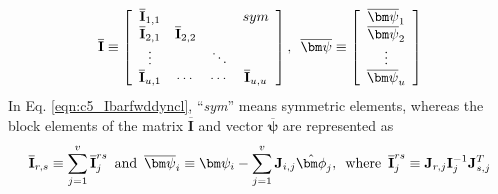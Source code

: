 {	\begin{equation}
	\label{eqn:c5_Ibarfwddyncl}
	\overline{\textbf{I}} \equiv
	\left[ \begin{array}{cccc}
	\overline{\textbf{I}}_{1,1} & \hspace*{5pt} & \hspace*{5pt} &  sym\\
	\overline{\textbf{I}}_{2,1} & \overline{\textbf{I}}_{2,2} & \hspace*{5pt} & \hspace*{5pt}\\
	\vdots & & \ddots & \hspace*{5pt} \\
	\overline{\textbf{I}}_{u,1}  & \cdots&  \cdots & \overline{\textbf{I}}_{u,u}  \\
	\end{array} \right], \hspace*{5pt}
	\mbox{$\overline{\bm\psi}$} \equiv  
	\left[ \begin{array}{c}
	\mbox{$\overline{\bm\psi}_1$}\\
	\mbox{$\overline{\bm\psi}_2$}\\
	\vdots\\
	\mbox{$\overline{\bm\psi}_u$}\\
	\end{array} \right]
	\end{equation}
	In Eq. \ref{eqn:c5_Ibarfwddyncl}, ``\emph{sym}'' means symmetric elements, whereas the block elements of the matrix $\overline{\textbf{I}}$ and vector \mbox{$\overline{\bm\psi}$} are represented as 
	\begin{equation}
	\label{eqn:c5_I_rsandPsi_cap}
	\overline{\textbf{I}}_{r,s} \equiv \sum_{j=1}^{v} \overline{\textbf{I}}_j^{rs} \hspace*{5pt} \mathrm{and} \hspace*{5pt} \mbox{$\overline{\bm\psi}_i$} \equiv \mbox{$\bm\psi_i$} - \sum_{j=1}^{v} \textbf{J}_{i,j}\hat{\bm\phi}_j, \hspace*{5pt} \mathrm{where} \hspace*{5pt} \overline{\textbf{I}}_j^{rs} \equiv \textbf{J$_{r,j}$}\textbf{I$^{-1}_j$}\textbf{J$_{s,j}^T$}\\
	\end{equation}
}
